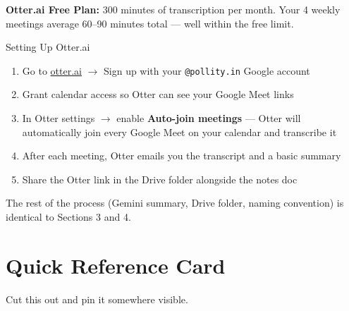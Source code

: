 \documentclass[11pt, a4paper]{article}
\begin{document}
\begin{greenbox}
\textbf{Otter.ai Free Plan:} 300 minutes of transcription per month. Your 4 weekly meetings average 60--90 minutes total --- well within the free limit.
\end{greenbox}

\vspace{0.5em}

\begin{stepbox}{Setting Up Otter.ai}
\begin{enumerate}[leftmargin=1.5em]
  \item Go to \href{https://otter.ai}{otter.ai} $\to$ Sign up with your \texttt{@pollity.in} Google account
  \item Grant calendar access so Otter can see your Google Meet links
  \item In Otter settings $\to$ enable \textbf{Auto-join meetings} --- Otter will automatically join every Google Meet on your calendar and transcribe it
  \item After each meeting, Otter emails you the transcript and a basic summary
  \item Share the Otter link in the Drive folder alongside the notes doc
\end{enumerate}
\end{stepbox}

\vspace{1em}

The rest of the process (Gemini summary, Drive folder, naming convention) is identical to Sections 3 and 4.

\newpage

\section{Quick Reference Card}

Cut this out and pin it somewhere visible.
\end{document}
